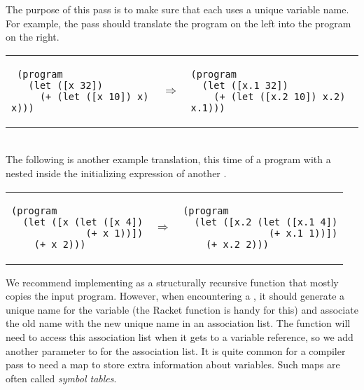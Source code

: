 \documentclass[11pt]{book}
\begin{document}
The purpose of this pass is to make sure that each  uses a
unique variable name. For example, the  pass should
translate the program on the left into the program on the right. \\
\begin{tabular}{lll}
\begin{minipage}{0.4\textwidth}
\begin{lstlisting}
 (program
   (let ([x 32])
     (+ (let ([x 10]) x) x)))
\end{lstlisting}
\end{minipage}
&
$\Rightarrow$
&
\begin{minipage}{0.4\textwidth}
\begin{lstlisting}
(program
  (let ([x.1 32])
    (+ (let ([x.2 10]) x.2) x.1)))
\end{lstlisting}
\end{minipage}
\end{tabular} \\
%
The following is another example translation, this time of a program
with a  nested inside the initializing expression of another
.\\
\begin{tabular}{lll}
\begin{minipage}{0.4\textwidth}
\begin{lstlisting}
(program
  (let ([x (let ([x 4])
             (+ x 1))])
    (+ x 2)))
\end{lstlisting}
\end{minipage}
&
$\Rightarrow$
&
\begin{minipage}{0.4\textwidth}
\begin{lstlisting}
(program
  (let ([x.2 (let ([x.1 4])
               (+ x.1 1))])
    (+ x.2 2)))
\end{lstlisting}
\end{minipage}
\end{tabular}

We recommend implementing  as a structurally recursive
function that mostly copies the input program. However, when
encountering a , it should generate a unique name for the
variable (the Racket function  is handy for this) and
associate the old name with the new unique name in an association
list. The  function will need to access this
association list when it gets to a variable reference, so we add
another parameter to  for the association list. It is
quite common for a compiler pass to need a map to store extra
information about variables. Such maps are often called \emph{symbol
  tables}.
\end{document}
